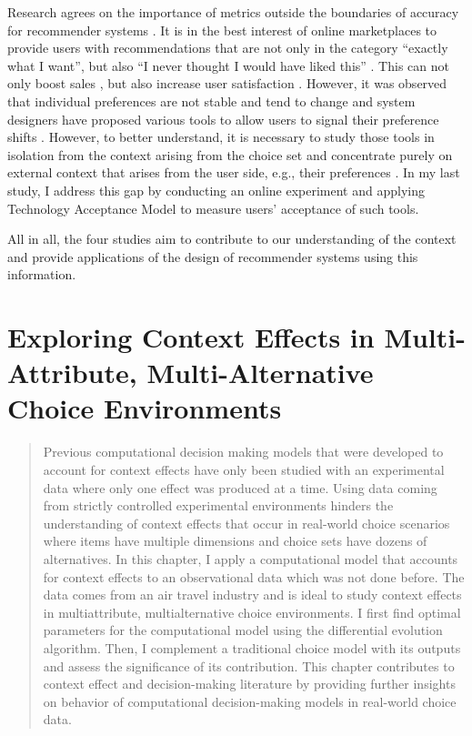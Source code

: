 \documentclass[a4paper,12pt]{article}
\begin{document}
Research agrees on the importance of metrics outside the boundaries of accuracy for recommender systems \citep{kaminskas2016diversity}. It is in the best interest of online marketplaces to provide users with recommendations that are not only in the category ``exactly what I want'', but also ``I never thought I would have liked this'' \citep{kotkovSurveySerendipityRecommender2016}. This can not only boost sales \citep{songWhenHowDiversify2019}, but also increase user satisfaction \citep{knijnenburgExplainingUserExperience2012}. However, it was observed that individual preferences are not stable and tend to change and system designers have proposed various tools to allow users to signal their preference shifts \citep{bostandjiev2012tasteweights,hijikata2012relation}. However, to better understand, it is necessary to study those tools in isolation from the context arising from the choice set and concentrate purely on external context that arises from the user side, e.g., their preferences \citep{adomavicius2011context}. In my last study, I address this gap by conducting an online experiment and applying Technology Acceptance Model \citep{davis1985technology} to measure users' acceptance of such tools.

All in all, the four studies aim to contribute to our understanding of the context and provide applications of the design of recommender systems using this information.

\newpage

\section{Exploring Context Effects in Multi-Attribute, Multi-Alternative Choice Environments}\label{chapter:simulationStudy}
\begin{abstract}
    
    Previous computational decision making models that were developed to account for context effects have only been studied with an experimental data where only one effect was produced at a time. Using data coming from strictly controlled experimental environments hinders the understanding of context effects that occur in real-world choice scenarios where items have multiple dimensions and choice sets have dozens of alternatives. In this chapter, I apply a computational model that accounts for context effects to an observational data which was not done before. The data comes from an air travel industry and is ideal to study context effects in multiattribute, multialternative choice environments. I first find optimal parameters for the computational model using the differential evolution algorithm. Then, I complement a traditional choice model with its outputs and assess the significance of its contribution. This chapter contributes to context effect and decision-making literature by providing further insights on behavior of computational decision-making models in real-world choice data.
    
\end{abstract}
\end{document}
